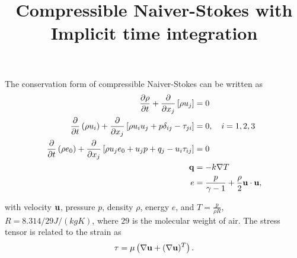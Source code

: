 \documentclass[10pt]{article}
\begin{document}
\title{Compressible Naiver-Stokes with Implicit time integration}
\date{}
\maketitle
The conservation form of compressible Naiver-Stokes can be written as
\begin{equation}
\begin{aligned}
\frac{\partial \rho}{\partial t} + \frac{\partial}{\partial x_j}\left[ \rho u_j \right] &= 0 \\
\frac{\partial}{\partial t}\left( \rho u_i \right) + \frac{\partial}{\partial x_j} \left[ \rho u_i u_j + p \delta_{ij} - \tau_{ji} \right] &= 0, \quad i=1,2,3 \\
\frac{\partial}{\partial t}\left( \rho e_0 \right) +
\frac{\partial}{\partial x_j}\left[ \rho u_j e_0 + u_j p + q_j - u_i \tau_{ij} \right] &= 0 \\
{\bf q} &= -k\nabla T \\
  e &= \frac{p}{\gamma - 1}+ \frac{\rho}{2}{{\bf u} \cdot {\bf u}} ,
\end{aligned}
\end{equation}

with velocity $\bf u$, pressure $p$, density $\rho$, energy $e$, and $T = \frac{p}{\rho R}$, $R = 8.314/29 J/(kg K)$, where $29$ is the molecular weight of air.
The stress tensor is related to the strain as
\[
  {\bf \tau}=\mu\left(\nabla{\bf u}+(\nabla {\bf u})^T\right).
\]
\end{document}
